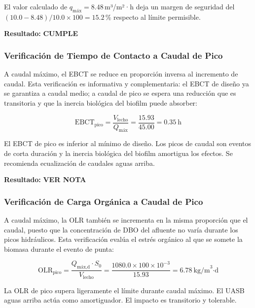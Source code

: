 \documentclass[12pt,a4paper]{article}
\newcommand{\captionequation}[1]{\vspace{-0.5em}\caption*{#1}\vspace{0.5em}}
\begin{document}
El valor calculado de $q_{\text{máx}} = 8.48$\,m³/m²·h deja un margen de seguridad del $(10.0 - 8.48) / 10.0 \times 100 = 15.2$\,\% respecto al límite permisible.

\textbf{Resultado:} \textbf{CUMPLE}

\subsubsection*{Verificación de Tiempo de Contacto a Caudal de Pico}

A caudal máximo, el EBCT se reduce en proporción inversa al incremento de caudal. Esta verificación es informativa y complementaria: el EBCT de diseño ya se garantiza a caudal medio; a caudal de pico se espera una reducción que es transitoria y que la inercia biológica del biofilm puede absorber:

\begin{equation}
\text{EBCT}_{\text{pico}} = \frac{V_{\text{lecho}}}{Q_{\text{máx}}} = \frac{15.93}{45.00} = 0.35\ \text{h}
\end{equation}
\captionequation{EBCT a caudal máximo horario}

El EBCT de pico es inferior al mínimo de diseño. Los picos de caudal son eventos de corta duración y la inercia biológica del biofilm amortigua los efectos. Se recomienda ecualización de caudales aguas arriba.

\textbf{Resultado:} \textbf{VER NOTA}

\subsubsection*{Verificación de Carga Orgánica a Caudal de Pico}

A caudal máximo, la OLR también se incrementa en la misma proporción que el caudal, puesto que la concentración de DBO del afluente no varía durante los picos hidráulicos. Esta verificación evalúa el estrés orgánico al que se somete la biomasa durante el evento de punta:

\begin{equation}
\text{OLR}_{\text{pico}} = \frac{Q_{\text{máx,d}} \cdot S_0}{V_{\text{lecho}}} = \frac{1080.0 \times 100 \times 10^{-3}}{15.93} = 6.78\ \text{kg/m}^3\text{·d}
\end{equation}
\captionequation{OLR a caudal máximo horario}

La OLR de pico supera ligeramente el límite durante caudal máximo. El UASB aguas arriba actúa como amortiguador. El impacto es transitorio y tolerable.
\end{document}
